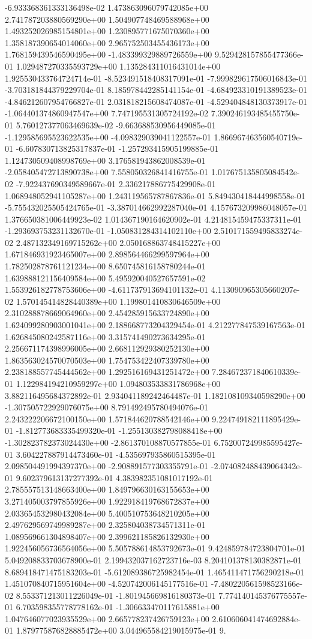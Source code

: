 -6.933368361333136498e-02	1.473863096079742085e+00	2.741787203880569290e+00	1.504907748469588968e+00	1.493252026985154801e+00	1.230895771675070360e+00	1.358187390654014060e+00	2.965752503455436173e+00	1.768159439546590495e+00	-1.483399329889726559e+00	9.529428157855477366e-01	1.029487270335593729e+00	1.135284311016431014e+00	1.925530433764724714e-01	-8.523491518408317091e-01	-7.999829617506016843e-01	-3.703181844379229704e-01	8.185978442285141154e-01	-4.684923310191389523e-01	-4.846212607954766827e-01	2.031818215608474087e-01	-4.529404848130373917e-01	-1.064401374860947547e+00	7.747195531305724192e-02	7.390246193485455750e-01	5.760127377063469639e-02	-9.663688530956449085e-01	-1.129585695523622535e+00	-4.098329039041122557e-01	1.866967463560540719e-01	-6.607830713825317837e-01	-1.257293415905199885e-01	1.124730509408998769e+00	3.176581943862008539e-01	-2.058405472713890738e+00	7.558050326841416755e-01	1.017675135805084542e-02	-7.922437690349589667e-01	2.336217886775429908e-01	1.068948052941105287e+00	1.243119565787867836e-01	5.849430418444998558e-01	-5.755432025505424765e-01	-3.387014662992287040e-01	4.157673209986048057e-01	1.376650381006449923e-02	1.014367190164620902e-01	4.214815459475337311e-01	-1.293693753231132670e-01	-1.050831284314102110e+00	2.510171559495833274e-02	2.487132349169715262e+00	2.050168863748415227e+00	1.671846931923465007e+00	2.898564466299597964e+00	1.782502878761121234e+00	8.650745816158780244e-01	1.639888121156409584e+00	5.495920040527657591e-02	1.553926182778753606e+00	-4.611737913694101132e-01	4.113090965305660207e-02	1.570145414828440389e+00	1.199801410830646509e+00	2.310288878669064960e+00	2.454285915633724890e+00	1.624099280903001041e+00	2.188668773204329454e-01	4.212277847539167563e-01	1.626845080242587116e+00	3.315741490273634295e-01	2.256671174398996005e+00	2.668112929380252130e+00	1.863563024570070503e+00	1.754753422407339780e+00	2.238188557745444562e+00	1.292516169431251472e+00	7.284672371840610339e-01	1.122984194210959297e+00	1.094803533831786968e+00	3.882116495684372892e-01	2.934041189242464487e-01	1.182108109340598290e+00	-1.307505722929076075e+00	8.791492495780494076e-01	2.243222206672100150e+00	1.571844620788542146e+00	9.224749182111895429e-01	-1.812773683335499320e-01	-1.255130382798088418e+00	-1.302823782373024430e+00	-2.861370108870577855e-01	6.752007249985595427e-01	3.604227887914473460e-01	-4.535697935860515395e-01	2.098504491994397370e+00	-2.908891577303355791e-01	-2.074082488439064342e-01	9.602379613137277392e-01	4.383982351081017192e-01	2.785557513148663400e+00	1.849796630163155653e+00	3.271405003797855926e+00	1.922918419768672837e+00	2.033654532980432084e+00	5.400510753648210205e+00	2.497629569749989287e+00	2.325804038734571311e-01	1.089569661304898407e+00	2.399621185826132930e+00	1.922456056736564056e+00	5.505788614853792673e-01	9.424859784723804701e-01	5.049208833703678900e-01	2.199432037162723716e-03	8.204101378130382871e-01	8.689418471475183203e-01	-5.612089386725982454e-01	1.465411471756290218e-01	1.451070840715951604e+00	-4.520742006145177516e-01	-7.480220561598523166e-02	8.553371213011226049e-01	-1.801945669816180373e-01	7.774140145376775557e-01	6.703598355778778162e-01	-1.306633470117615881e+00	1.047646077023935529e+00	2.665778237426759123e+00	2.610606041474692884e-01	1.879775876828885472e+00	3.044965584219015975e-01	9.